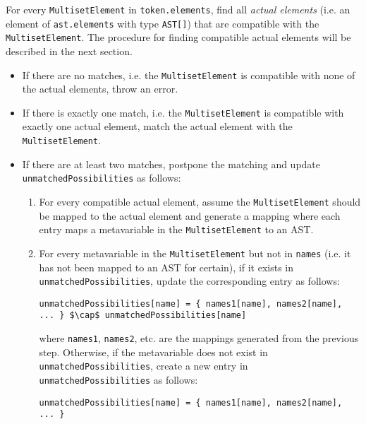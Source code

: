 For every \lstinline{MultisetElement} in \lstinline{token.elements}, find all \textit{actual elements} (i.e. an element of \lstinline{ast.elements} with type \lstinline{AST[]}) that are compatible with the \lstinline{MultisetElement}. The procedure for finding compatible actual elements will be described in the next section.
\begin{itemize}
    \item If there are no matches, i.e. the \lstinline{MultisetElement} is compatible with none of the actual elements, throw an error.
    \item If there is exactly one match, i.e. the \lstinline{MultisetElement} is compatible with exactly one actual element, match the actual element with the \lstinline{MultisetElement}.
    \item If there are at least two matches, postpone the matching and update \lstinline{unmatchedPossibilities} as follows:
    \begin{enumerate}
        \item For every compatible actual element, assume the \lstinline{MultisetElement} should be mapped to the actual element and generate a mapping where each entry maps a metavariable in the \lstinline{MultisetElement} to an AST.
        \item For every metavariable in the \lstinline{MultisetElement} but not in \lstinline{names} (i.e. it has not been mapped to an AST for certain), if it exists in \lstinline{unmatchedPossibilities}, update the corresponding entry as follows:
        \begin{center}
            \lstinline|unmatchedPossibilities[name] = { names1[name], names2[name], ... } $\cap$ unmatchedPossibilities[name]|
        \end{center}
        where \lstinline{names1}, \lstinline{names2}, etc. are the mappings generated from the previous step. Otherwise, if the metavariable does not exist in \lstinline{unmatchedPossibilities}, create a new entry in \lstinline{unmatchedPossibilities} as follows:
        \begin{center}
            \lstinline|unmatchedPossibilities[name] = { names1[name], names2[name], ... }|
        \end{center}
    \end{enumerate}
\end{itemize}

